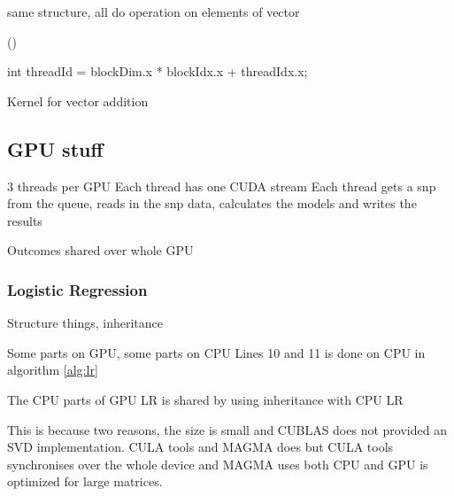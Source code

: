 \documentclass[10pt,a4paper]{report}
\begin{document}
same structure, all do operation on elements of vector

\begin{algorithm}
\DontPrintSemicolon
\SetStartEndCondition{ (}{)}{)}\SetAlgoBlockMarkers{\{}{\}}
\AlgoDisplayBlockMarkers
\SetAlgoNoLine
\SetFuncSty{}
\SetArgSty{}

\BlankLine \BlankLine


\BlankLine \BlankLine


\Fn(){}{
    
 \textcolor{keyword}{int} threadId = blockDim.x * blockIdx.x + threadIdx.x;

 \BlankLine \BlankLine
 
}

\caption{Kernel for vector addition}
\label{alg:kernel_elemenwise_add}
\end{algorithm}

\subsection{GPU stuff}
3 threads per GPU
Each thread has one CUDA stream
Each thread gets a snp from the queue, reads in the snp data, calculates the models and writes the results

Outcomes shared over whole GPU

\subsubsection{Logistic Regression}
Structure things, inheritance

Some parts on GPU, some parts on CPU
Lines 10 and 11 is done on CPU in algorithm \ref{alg:lr}

The CPU parts of GPU LR is shared by using inheritance with CPU LR

This is because two reasons, the size is small and CUBLAS does not provided an SVD implementation. CULA tools and MAGMA does but CULA tools synchronises over the whole device and MAGMA uses both CPU and GPU is optimized for large matrices.
\end{document}
